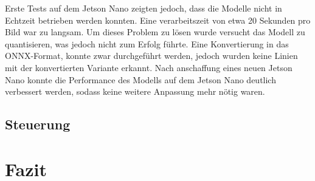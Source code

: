 \documentclass{article}
\begin{document}
            
            Erste Tests auf dem Jetson Nano zeigten jedoch, dass die Modelle nicht in Echtzeit betrieben werden konnten. Eine verarbeitszeit von etwa 20 Sekunden pro Bild war zu langsam.
            Um dieses Problem zu lösen wurde versucht das Modell zu quantisieren, was jedoch nicht zum Erfolg führte.
            Eine Konvertierung in das ONNX-Format, konnte zwar durchgeführt werden, jedoch wurden keine Linien mit der konvertierten Variante erkannt.
            Nach anschaffung eines neuen Jetson Nano konnte die Performance des Modells auf dem Jetson Nano deutlich verbessert werden, sodass keine weitere Anpassung mehr nötig waren.
        \subsection{Steuerung}
    \section{Fazit}
\end{document}
